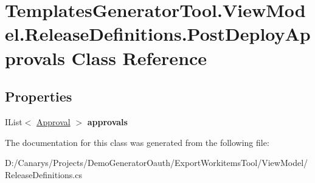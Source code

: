 \hypertarget{class_templates_generator_tool_1_1_view_model_1_1_release_definitions_1_1_post_deploy_approvals}{}\section{Templates\+Generator\+Tool.\+View\+Model.\+Release\+Definitions.\+Post\+Deploy\+Approvals Class Reference}
\label{class_templates_generator_tool_1_1_view_model_1_1_release_definitions_1_1_post_deploy_approvals}
\subsection*{Properties}
\begin{DoxyCompactItemize}
\item 
\mbox{\label{class_templates_generator_tool_1_1_view_model_1_1_release_definitions_1_1_post_deploy_approvals_ab5c17a61fadbe5c5e0973858fab6e27d}} 
I\+List$<$ \mbox{\hyperlink{class_templates_generator_tool_1_1_view_model_1_1_release_definitions_1_1_approval}{Approval}} $>$ {\bfseries approvals}
\end{DoxyCompactItemize}


The documentation for this class was generated from the following file\+:\begin{DoxyCompactItemize}
\item 
D\+:/\+Canarys/\+Projects/\+Demo\+Generator\+Oauth/\+Export\+Workitems\+Tool/\+View\+Model/Release\+Definitions.\+cs\end{DoxyCompactItemize}
